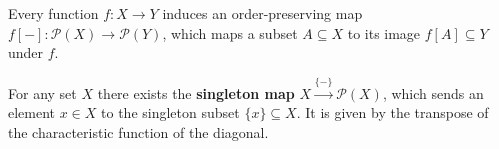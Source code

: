 \documentclass{article}
\begin{document}
	\begin{proposition}
		Every function $f:X\rightarrow Y$ induces an order-preserving map $f[-]:\mathcal{P}(X) \rightarrow \mathcal{P}(Y)$, which maps a subset $A\subseteq X$ to its image $f[A] \subseteq Y$ under $f$.

	\end{proposition}



	\begin{definition}
		For any set $X$ there exists the \textbf{singleton map} $X \xrightarrow{\{-\}} \mathcal{P}(X)$, which sends an element $x\in X$ to the singleton subset $\{x\}\subseteq X$. It is given by the transpose of the characteristic function of the diagonal. 
	\end{definition}



\end{document}
